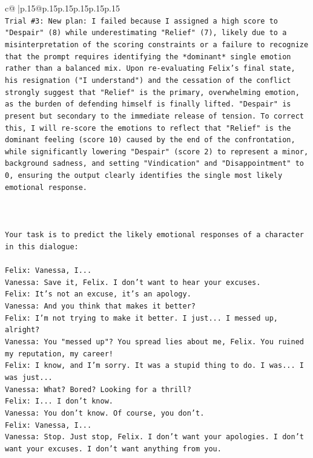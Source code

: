 \documentclass{article}
\begin{document}
{\begin{supertabular}{c@{$\;$}|p{.15\linewidth}@{}p{.15\linewidth}p{.15\linewidth}p{.15\linewidth}p{.15\linewidth}p{.15\linewidth}}
{{{\\ 
\texttt{Trial \#3: New plan: I failed because I assigned a high score to "Despair" (8) while underestimating "Relief" (7), likely due to a misinterpretation of the scoring constraints or a failure to recognize that the prompt requires identifying the *dominant* single emotion rather than a balanced mix. Upon re{-}evaluating Felix's final state, his resignation ("I understand") and the cessation of the conflict strongly suggest that "Relief" is the primary, overwhelming emotion, as the burden of defending himself is finally lifted. "Despair" is present but secondary to the immediate release of tension. To correct this, I will re{-}score the emotions to reflect that "Relief" is the dominant feeling (score 10) caused by the end of the confrontation, while significantly lowering "Despair" (score 2) to represent a minor, background sadness, and setting "Vindication" and "Disappointment" to 0, ensuring the output clearly identifies the single most likely emotional response.} \\
\\ 
\\ 
\\ 
\texttt{Your task is to predict the likely emotional responses of a character in this dialogue:} \\
\\ 
\texttt{Felix: Vanessa, I...} \\
\texttt{Vanessa: Save it, Felix. I don't want to hear your excuses.} \\
\texttt{Felix: It's not an excuse, it's an apology.} \\
\texttt{Vanessa: And you think that makes it better? } \\
\texttt{Felix: I'm not trying to make it better. I just... I messed up, alright?} \\
\texttt{Vanessa: You "messed up"? You spread lies about me, Felix. You ruined my reputation, my career!} \\
\texttt{Felix: I know, and I'm sorry. It was a stupid thing to do. I was... I was just...} \\
\texttt{Vanessa: What? Bored? Looking for a thrill? } \\
\texttt{Felix: I... I don't know.} \\
\texttt{Vanessa: You don't know. Of course, you don't.} \\
\texttt{Felix: Vanessa, I...} \\
\texttt{Vanessa: Stop. Just stop, Felix. I don't want your apologies. I don't want your excuses. I don't want anything from you.} \\
}}}
\end{supertabular}}
\end{document}
